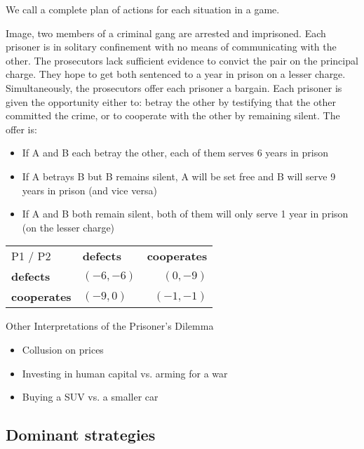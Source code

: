 We call a  complete plan of actions for each situation in a game.

\begin{example} \label{prisonersdilemma} 
	 Image, two members of a criminal gang are arrested and imprisoned. Each prisoner is in solitary confinement with no means of communicating with the other. The prosecutors lack sufficient evidence to convict the pair on the principal charge. They hope to get both sentenced to a year in prison on a lesser charge. Simultaneously, the prosecutors offer each prisoner a bargain. Each prisoner is given the opportunity either to: betray the other by testifying that the other committed the crime, or to cooperate with the other by remaining silent. The offer is:
	\begin{itemize}
		\item If A and B each betray the other, each of them serves 6 years in prison
		\item If A betrays B but B remains silent, A will be set free and B will serve 9 years in prison (and vice versa)
		\item If A and B both remain silent, both of them will only serve 1 year in prison (on the lesser charge)
	\end{itemize}
	
\begin{center}
	\begin{tabular}{|l|l|r|}
		\hline\hline
  			P1 / P2 & \textbf{defects} & \textbf{cooperates} \\
         		\cline{1-3}
   			\textbf{defects} & $(-6, -6)$ & $(0, -9)$ 	\arrayrulewidth2pt \\
            	\cline{1-3}
   			\textbf{cooperates} & $(-9, 0)$ & $(-1, -1)$ \\ \hline\hline
	\end{tabular}	
\end{center}


	Other Interpretations of the Prisoner's Dilemma
	\begin{itemize}
		\item Collusion on prices
		\item Investing in human capital vs. arming for a war
		\item Buying a SUV vs. a smaller car
	\end{itemize}
\end{example}


\subsection{Dominant strategies}

